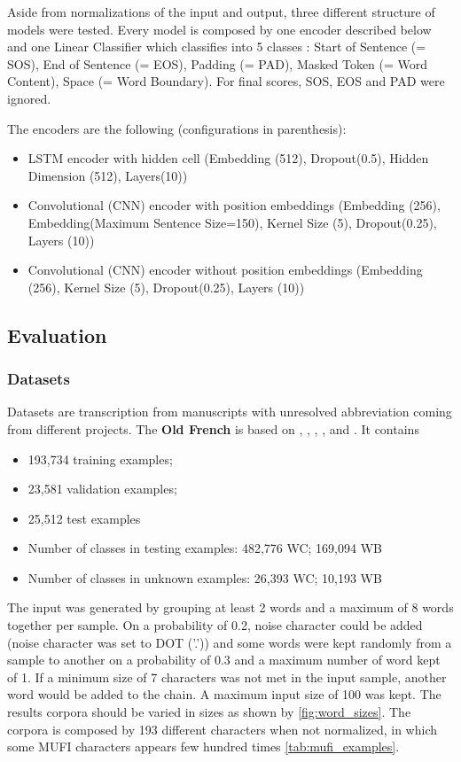 \documentclass{jdmdh}
\begin{document}
Aside from normalizations of the input and output, three different structure of models were tested. Every model is composed by one encoder described below and one Linear Classifier which classifies into 5 classes : Start of Sentence (= SOS), End of Sentence (= EOS), Padding (= PAD), Masked Token (= Word Content), Space (= Word Boundary). For final scores, SOS, EOS and PAD were ignored.

The encoders are the following (configurations in parenthesis):

\begin{itemize}
  \item LSTM encoder with hidden cell (Embedding (512), Dropout(0.5), Hidden Dimension (512), Layers(10))
  \item Convolutional (CNN) encoder with position embeddings (Embedding (256), Embedding(Maximum Sentence Size=150), Kernel Size (5), Dropout(0.25), Layers (10))
  \item Convolutional (CNN) encoder without position embeddings (Embedding (256), Kernel Size (5), Dropout(0.25), Layers (10))
\end{itemize}

\subsection{Evaluation}

\subsubsection{Datasets}

Datasets are transcription from manuscripts with unresolved abbreviation coming from different projects. The \textbf{Old French} is based on \citet{8269990}, \citet{pinche:hal-01628533}, \citet{jean_baptiste_camps_2019_2630574}, \citet{bfmmss}, and \citet{tnah_transcription}. It contains

\begin{itemize}
    \item 193,734 training examples;
    \item 23,581 validation examples;
    \item 25,512 test examples
    \item Number of classes in testing examples: 482,776 WC; 169,094 WB
    \item Number of classes in unknown examples: 26,393 WC; 10,193 WB
\end{itemize}

The input was generated by grouping at least 2 words and a maximum of 8 words together per sample. On a probability of 0.2, noise character could be added (noise character was set to DOT ('.')) and some words were kept randomly from a sample to another on a probability of 0.3 and a maximum number of word kept of 1. If a minimum size of 7 characters was not met in the input sample, another word would be added to the chain. A maximum input size of 100 was kept. The results corpora should be varied in sizes as shown by \ref{fig:word_sizes}. The corpora is composed by 193 different characters when not normalized, in which some MUFI characters appears few hundred times \ref{tab:mufi_examples}.
\end{document}
